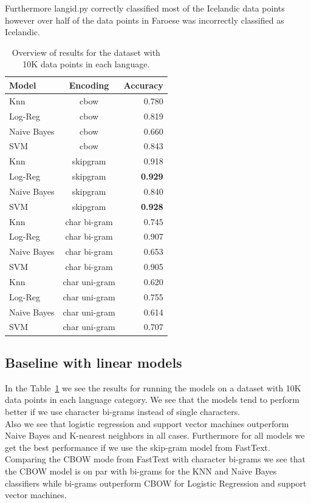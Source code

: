 Furthermore langid.py correctly classified most of the Icelandic data points however over half of the data points in Faroese was incorrectly classified as Icelandic.\\

\begin{table}
  \centering
  \begin{tabular}{ l | c | r }
    \hline
    Model               & Encoding  & Accuracy \\
    \hline
    Knn                 & cbow &  0.780\\
    Log-Reg             & cbow &  0.819\\
    Naive Bayes         & cbow &  0.660\\
    SVM                 & cbow &  0.843\\
    Knn                 & skipgram &  0.918\\
    Log-Reg             & skipgram &  \textbf{0.929}\\
    Naive Bayes         & skipgram &  0.840\\
    SVM                 & skipgram &  \textbf{0.928}\\
    Knn                 & char bi-gram  & 0.745\\
    Log-Reg             & char bi-gram  & 0.907\\
    Naive Bayes         & char bi-gram  & 0.653\\
    SVM                 & char bi-gram  & 0.905\\
    Knn                 & char uni-gram  & 0.620\\
    Log-Reg             & char uni-gram  & 0.755\\
    Naive Bayes         & char uni-gram  & 0.614\\
    SVM                 & char uni-gram  & 0.707\\
    \hline
  \end{tabular}
  \caption{Overview of results for the dataset with 10K data points in each language.}
  \label{baseline-results-10k}
\end{table}

\subsection{Baseline with linear models}

In the Table~\ref{baseline-results-10k} we see the results for running the models on a dataset with 10K data points in each language category. We see that the models tend to perform better if we use character bi-grams instead of single characters.\\

Also we see that logistic regression and support vector machines outperform Naive Bayes and K-nearest neighbors in all cases. Furthermore for all models we get the best performance if we use the skip-gram model from FastText.\\

Comparing the CBOW mode from FastText with character bi-grams we see that the CBOW model is on par with bi-grams for the KNN and Naive Bayes classifiers while bi-grams outperform  CBOW for Logistic Regression and support vector machines.\\

